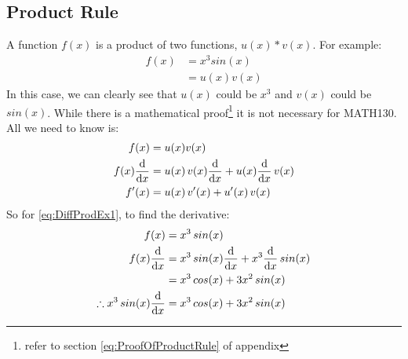 \subsection{Product Rule}
\label{sec:ProductRule}
A function $f(x)$ is a product of two functions, $u(x) * v(x)$. For example:
\begin{align}
  f(x) & = {x}^{3} sin(x) \label{eq:DiffProdEx1}\\
       & = u(x)v(x)
\end{align}
In this case, we can clearly see that $u(x)$ could be ${x}^{3}$ and $v(x)$
could be $sin(x)$. While there is a mathematical proof\footnote{refer to section
\ref{eq:ProofOfProductRule} of appendix} it is not necessary for MATH130.
All we need to know is:
\begin{align}
             f(x) & = u(x)v(x) \\
  f(x)\frac{\mathrm{d}}{\mathrm{d}x} & = u(x)\,v(x)\frac{\mathrm{d}}{\mathrm{d}x} + u(x)\frac{\mathrm{d}}{\mathrm{d}x}\,v(x) \\
            f'(x) & = u(x)\,v'(x) + u'(x)\,v(x)
\end{align}
So for \ref{eq:DiffProdEx1}, to find the derivative:
\begin{align}
            f(x)  & = {x}^{3}\,sin(x) \nonumber \\
  f(x)\frac{\mathrm{d}}{\mathrm{d}x} & = {x}^{3}\,sin(x)\frac{\mathrm{d}}{\mathrm{d}x} + {x}^{3}\frac{\mathrm{d}}{\mathrm{d}x}\,sin(x) \\
                  & = {x}^{3}\,cos(x) + 3{x}^{2}\,sin(x) \\
  \therefore {x}^{3}\,sin(x)\frac{\mathrm{d}}{\mathrm{d}x}  & = {x}^{3}\,cos(x) + 3{x}^{2}\,sin(x)
\end{align}
